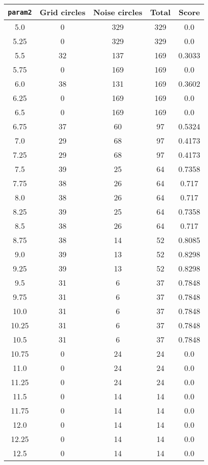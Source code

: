 \documentclass[letterpaper, 12pt]{article}
\begin{document}
\begin{longtable}{|c|c|c|c|c|}
\hline
\textbf{\texttt{param2}} & \textbf{Grid circles} & \textbf{Noise circles} & \textbf{Total} & \textbf{Score} \\
\hline
5.0 & 0 & 329 & 329 & 0.0 \\
\hline
5.25 & 0 & 329 & 329 & 0.0 \\
\hline
5.5 & 32 & 137 & 169 & 0.3033 \\
\hline
5.75 & 0 & 169 & 169 & 0.0 \\
\hline
6.0 & 38 & 131 & 169 & 0.3602 \\
\hline
6.25 & 0 & 169 & 169 & 0.0 \\
\hline
6.5 & 0 & 169 & 169 & 0.0 \\
\hline
6.75 & 37 & 60 & 97 & 0.5324 \\
\hline
7.0 & 29 & 68 & 97 & 0.4173 \\
\hline
7.25 & 29 & 68 & 97 & 0.4173 \\
\hline
7.5 & 39 & 25 & 64 & 0.7358 \\
\hline
7.75 & 38 & 26 & 64 & 0.717 \\
\hline
8.0 & 38 & 26 & 64 & 0.717 \\
\hline
8.25 & 39 & 25 & 64 & 0.7358 \\
\hline
8.5 & 38 & 26 & 64 & 0.717 \\
\hline
8.75 & 38 & 14 & 52 & 0.8085 \\
\hline
9.0 & 39 & 13 & 52 & 0.8298 \\
\hline
9.25 & 39 & 13 & 52 & 0.8298 \\
\hline
9.5 & 31 & 6 & 37 & 0.7848 \\
\hline
9.75 & 31 & 6 & 37 & 0.7848 \\
\hline
10.0 & 31 & 6 & 37 & 0.7848 \\
\hline
10.25 & 31 & 6 & 37 & 0.7848 \\
\hline
10.5 & 31 & 6 & 37 & 0.7848 \\
\hline
10.75 & 0 & 24 & 24 & 0.0 \\
\hline
11.0 & 0 & 24 & 24 & 0.0 \\
\hline
11.25 & 0 & 24 & 24 & 0.0 \\
\hline
11.5 & 0 & 14 & 14 & 0.0 \\
\hline
11.75 & 0 & 14 & 14 & 0.0 \\
\hline
12.0 & 0 & 14 & 14 & 0.0 \\
\hline
12.25 & 0 & 14 & 14 & 0.0 \\
\hline
12.5 & 0 & 14 & 14 & 0.0 \\

\end{longtable}
\end{document}
